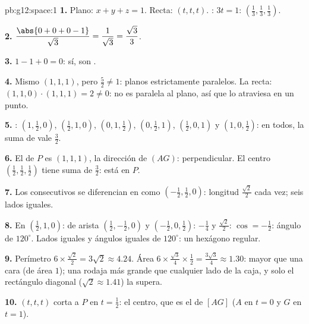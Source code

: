\begin{solution}{pb:g12:space:1}
\textbf{1.} Plano: $x + y + z = 1$. Recta: $(t, t, t)$. :
$3t = 1$: $\left(\frac13, \frac13, \frac13\right)$.

\textbf{2.} $\dfrac{\abs{0 + 0 + 0 - 1}}{\sqrt3} =
\dfrac{1}{\sqrt3} = \dfrac{\sqrt3}{3}$.

\textbf{3.} $1 - 1 + 0 = 0$: sí, son .

\textbf{4.} Mismo  $(1,1,1)$, pero $\frac52 \neq 1$: planos
estrictamente paralelos. La recta: $(1,1,0) \cdot (1,1,1) = 2 \neq 0$: no
es paralela al plano, así que lo atraviesa en un punto.

\textbf{5.} : $\left(1, \frac12, 0\right)$,
$\left(\frac12, 1, 0\right)$, $\left(0, 1, \frac12\right)$,
$\left(0, \frac12, 1\right)$, $\left(\frac12, 0, 1\right)$ y
$\left(1, 0, \frac12\right)$: en todos, la suma de  vale
$\frac32$.

\textbf{6.} El  de $P$ es $(1,1,1)$, la dirección de $(AG)$:
perpendicular. El centro $\left(\frac12,\frac12,\frac12\right)$ tiene suma
de  $\frac32$: está en $P$.

\textbf{7.} Los  consecutivos se diferencian en  como
$\left(-\frac12, \frac12, 0\right)$: longitud $\frac{\sqrt2}{2}$ cada vez;
seis lados iguales.

\textbf{8.} En $\left(\frac12, 1, 0\right)$:  de arista
$\left(\frac12, -\frac12, 0\right)$ y
$\left(-\frac12, 0, \frac12\right)$:  $-\frac14$ y 
$\frac{\sqrt2}{2}$: $\cos = -\frac12$: ángulo de $120^\circ$. Lados iguales
y ángulos iguales de $120^\circ$: un hexágono regular.

\textbf{9.} Perímetro $6 \times \frac{\sqrt2}{2} = 3\sqrt2 \approx 4.24$.
Área $6 \times \frac{\sqrt3}{4} \times \frac12 = \frac{3\sqrt3}{4}
\approx 1.30$: mayor que una cara (de área $1$); una rodaja más grande que
cualquier lado de la caja, y solo el rectángulo diagonal
($\sqrt2 \approx 1.41$) la supera.

\textbf{10.} $(t,t,t)$ corta a $P$ en $t = \frac12$: el centro, que es el
 de $[AG]$ ($A$ en $t = 0$ y $G$ en $t = 1$).


\end{solution}
